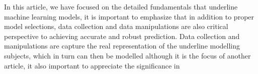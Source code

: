 
\par
In this article, we have focused on the detailed fundamentals that underline machine learning models, it is important to emphasize that in addition to proper model selections, data collection and data manipulations are also critical perspective to achieving accurate and robust prediction. Data collection and manipulations are capture the real representation of the underline modelling subjects, which in turn can then be modelled  although it is the focus of another article, it also important to appreciate the significance in 
\par 
